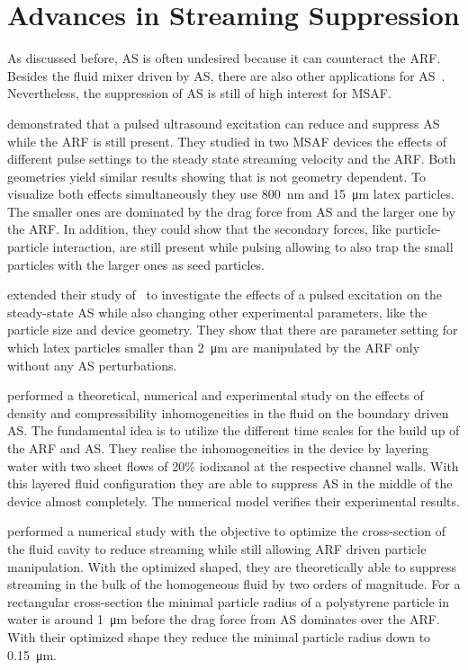 \section{Advances in Streaming Suppression}

As discussed before, AS is often undesired because it can counteract the ARF. 
Besides the fluid mixer driven by AS, there are also other applications for 
AS~\cite{Wiklund2012a}. Nevertheless, the suppression of AS is still of high 
interest for MSAF.

 demonstrated that a pulsed ultrasound excitation can reduce 
and suppress AS while the ARF is still present. They studied in two MSAF 
devices the effects of different pulse settings to the steady state streaming 
velocity and the ARF. Both geometries yield similar results showing that is not 
geometry dependent. To visualize both effects simultaneously they use 
\SI{800}{\nm} and \SI{15}{\um} latex particles. The smaller ones are dominated 
by the drag force from AS and the larger one by the ARF. In addition, they 
could show that the secondary forces, like particle-particle interaction, are 
still present while pulsing allowing to also trap the small particles with the 
larger ones as seed particles.

 extended their study of~\cite{Hoyos2013} to investigate the 
effects of a pulsed excitation on the steady-state AS while also changing other 
experimental parameters, like the particle size and device geometry. They show 
that there are parameter setting for which latex particles smaller than 
\SI{2}{\um} are manipulated by the ARF only without any AS perturbations.

 performed a theoretical, numerical and experimental study 
on the effects of density and compressibility inhomogeneities in the fluid on 
the boundary driven AS. The fundamental idea is to utilize the different time 
scales for the build up of the ARF and AS. They realise the inhomogeneities in 
the device by layering water with two sheet flows of 20\% iodixanol at the 
respective channel walls. With this layered fluid configuration they are able 
to suppress AS in the middle of the device almost completely. The numerical 
model verifies their experimental results.

 performed a numerical study with the objective to optimize the 
cross-section of the fluid cavity to reduce streaming while still allowing ARF 
driven particle manipulation. With the optimized shaped, they are theoretically 
able to suppress streaming in the bulk of the homogeneous fluid by two orders 
of magnitude. For a rectangular cross-section the minimal particle radius of a 
polystyrene particle in water is around \SI{1}{\um} before the drag force from 
AS dominates over the ARF. With their optimized shape they reduce the minimal 
particle radius down to \SI{0.15}{\um}.

